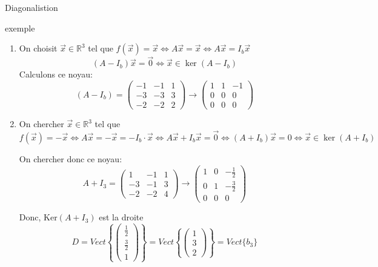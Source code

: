 \begin{parag}{Diagonalistion}
\begin{subparag}{exemple}
    \begin{enumerate}
        \item On choisit $\vec{x} \in \mathbb{R}^3$ tel que $f(\vec{x}) = \vec{x} \Leftrightarrow A\vec{x} = \vec{x} \Leftrightarrow A\vec{x} = I_b \vec{x}$
        \\
        \[(A - I_b)\vec{x} = \vec{0} \Leftrightarrow \vec{x} \in \ker (A - I_b)\]
        Calculons ce noyau:
        \[(A - I_b) = \begin{pmatrix}
            -1 & -1 & 1 \\
            -3  & -3 & 3 \\
            -2  & -2 & 2
        \end{pmatrix} \to \begin{pmatrix}
            1 & 1 & -1 \\
            0 & 0 & 0 \\
            0 & 0 & 0 
        \end{pmatrix}\]
    \item On chercher $\vec{x} \in \mathbb{R}^3$ tel que $f(\vec{x}) = -\vec{x} \Leftrightarrow A\vec{x} = -\vec{x} = -I_b\cdot\vec{x} \Leftrightarrow A\vec{x} + I_b\vec{x} = \vec{0} \Leftrightarrow (A + I_b)\vec{x} = 0 \Leftrightarrow \vec{x} \in \ker (A + I_b)$

    On chercher donc ce noyau:
\[A + I_3 = \begin{pmatrix}
    1 & -1 & 1\\
    -3 & -1 & 3\\
    -2 & -2 & 4
\end{pmatrix} \to \begin{pmatrix}
    1 & 0 & -\frac{1}{2}\\
    0 & 1 & -\frac{3}{2}\\
    0 & 0 & 0
\end{pmatrix}\]

Donc, Ker$(A + I_3)$ est la droite \\
\[D = Vect\left\{ \begin{pmatrix}
    \frac{1}{2}\\ \frac{3}{2} \\ 1
\end{pmatrix}\right\} =  Vect \left\{\begin{pmatrix}
    1 \\ 3 \\ 2
\end{pmatrix}\right\} = Vect \{b_3\}\]


\end{enumerate}
\end{subparag}
\end{parag}

